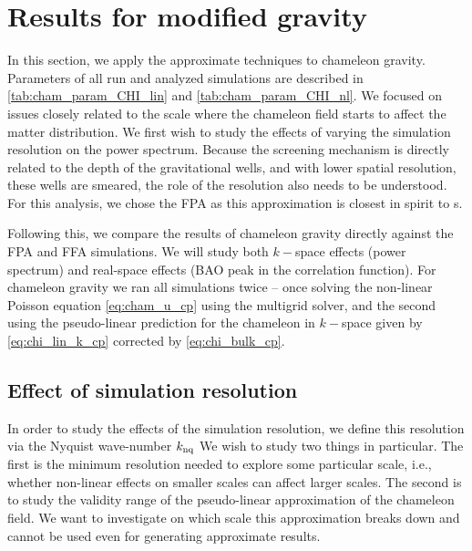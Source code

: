 \clearpage
\section{Results for modified gravity}
\newcommand{\chileft}{\hspace*{-1cm}}
In this section, we apply the approximate techniques to chameleon gravity. Parameters of all run and analyzed simulations are described in \autoref{tab:cham_param_CHI_lin} and \autoref{tab:cham_param_CHI_nl}. We focused on issues closely related to the scale where the chameleon field starts to affect the matter distribution. We first wish to study the effects of varying the simulation resolution on the power spectrum. Because the screening mechanism is directly related to the depth of the gravitational wells, and with lower spatial resolution, these wells are smeared, the role of the resolution also needs to be understood. For this analysis, we chose the FPA as this approximation is closest in spirit to \nbodysim s.

Following this, we compare the results of chameleon gravity directly against the FPA and FFA simulations. %
We will study both $k-$space effects (power spectrum) and real-space effects (BAO peak in the correlation function). For chameleon gravity we ran all simulations twice -- once solving the non-linear Poisson equation \eqref{eq:cham_u_cp} using the multigrid solver, and the second using the pseudo-linear prediction for the chameleon in $k-$space given by \eqref{eq:chi_lin_k_cp} corrected by \eqref{eq:chi_bulk_cp}.

\subsection{Effect of simulation resolution}
In order to study the effects of the simulation resolution, we define this resolution via the Nyquist wave-number $k_{\rm nq}$
We wish to study two things in particular. The first is the minimum resolution needed to explore some particular scale, i.e., whether non-linear effects on smaller scales can affect larger scales. The second is to study the validity range of the pseudo-linear approximation of the chameleon field. We want to investigate on which scale this approximation breaks down and cannot be used even for generating approximate results.

